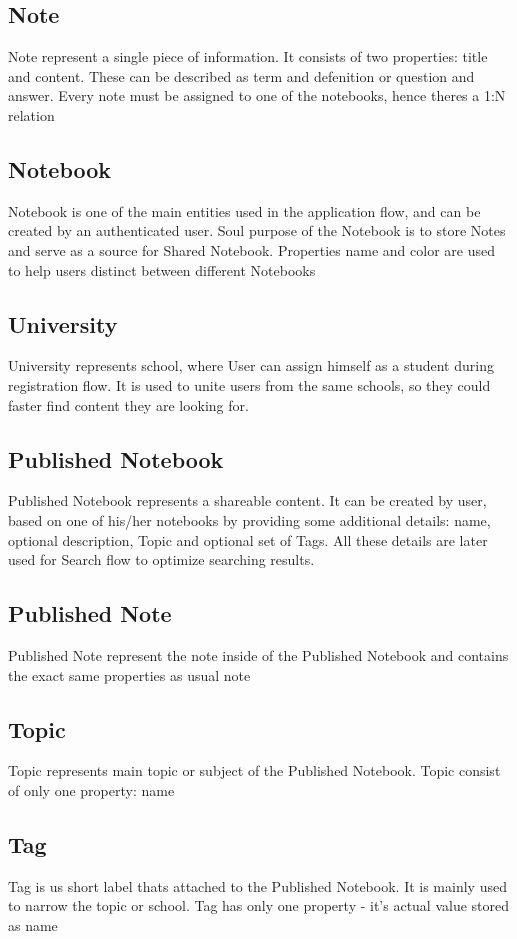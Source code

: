 \documentclass[thesis=B,english]{FITthesis}[2012/10/20]
\begin{document}
	
\subsection{Note}
	Note represent a single piece of information. It consists of two properties: title and content. These can be described as term and defenition or question and answer. Every note must be assigned to one of the notebooks, hence theres a 1:N relation
\subsection{Notebook}
	Notebook is one of the main entities used in the application flow, and  can be created by an authenticated user. Soul purpose of the Notebook is to store Notes and serve as a source for Shared Notebook. Properties name and color are used to help users distinct between different Notebooks
	
	
\subsection{University}
University represents school, where User can assign himself as a student during registration flow. It is used to unite users from the same schools, so they could faster find content they are looking for.

\subsection{Published Notebook}
Published Notebook represents a shareable content. It can be created by user, based on one of his/her notebooks by providing some additional details:
name, optional description,  Topic and optional set of Tags. All these details are later used for Search flow to optimize searching results.

\subsection{Published Note}
Published Note represent the note inside of the Published Notebook and  contains the exact same properties as usual note

\subsection{Topic}
Topic represents main topic or subject of the Published Notebook. Topic consist of only one property: name
\subsection{Tag}
Tag is us short label thats attached to the Published Notebook. It is mainly  used to narrow the topic or school. Tag has only one property - it's actual value stored as name
\end{document}
